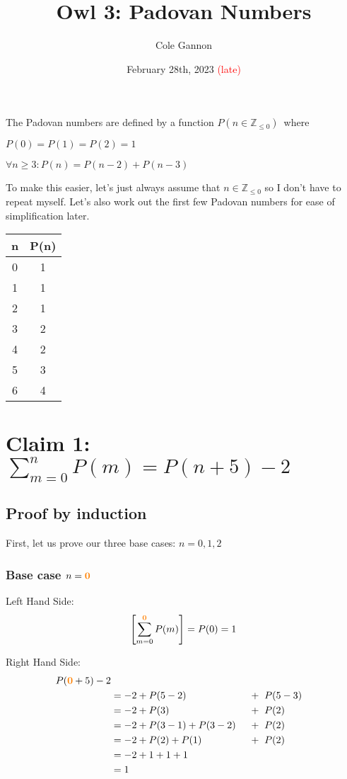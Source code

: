 \documentclass[11pt]{article}
\title{Owl 3: Padovan Numbers}
\author{Cole Gannon}
\date{February 28th, 2023 \textcolor{red}{(late)}}
\def \nonneg {\mathbb{Z}_{\leq 0}}
\def \lf {\newline}
\def \subsorange [#1]{\mathbf{\textcolor{orange}{#1}}}
\begin{document}
\maketitle
The Padovan numbers are defined by a function ${P(n \in \nonneg)}$\ where\lf

$P(0)=P(1)=P(2)=1$\lf

$\forall n \geq 3:P(n)=P(n-2)+P(n-3)$\lf

To make this easier, let's just always assume that $n\in\nonneg$ so I don't have to repeat myself.
Let's also work out the first few Padovan numbers for ease of simplification later.\lf


\begin{tabular}{||c c||}
   \hline n & P(n) \\ [0.5ex] \hline
   \hline 0 & 1 \\
   \hline 1 & 1 \\
   \hline 2 & 1 \\
   \hline 3 & 2 \\
   \hline 4 & 2 \\
   \hline 5 & 3 \\
   \hline 6 & 4 \\
   \hline
  \end{tabular}

\section*{Claim 1: $\displaystyle\sum_{m=0}^{n} P(m) = P(n+5)-2$}

\subsection*{Proof by induction}

First, let us prove our three base cases: $n=0,1,2$

\subsubsection*{Base case $n=\subsorange[0]$}

Left Hand Side:
\[
   \left[\sum_{m=0}^{\subsorange[0]}P(m)\right]=P(0)=1
\]

Right Hand Side:
\begin{alignat*}{2}
   P(\subsorange[0]+5)-2 \\
   &=-2+P(5-2)         &&+\ P(5-3) \\
   &=-2+P(3)           &&+\ P(2) \\
   &=-2+P(3-1)+P(3-2)\ &&+\ P(2) \\
   &=-2+P(2)+P(1)      &&+\ P(2) \\
   &=-2+1+1+1 \\
   &=1
\end{alignat*}
\end{document}
